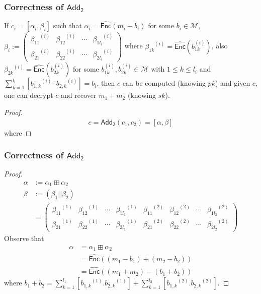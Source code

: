 \documentclass{beamer}
\begin{document}
\begin{frame}
\frametitle{Correctness of $\mathsf{Add_2}$}
\begin{theorem}
If $c_i=[\alpha_i,\beta_i]$ such that $\alpha_i=\widehat{\mathsf{Enc}}(m_i-b_i)$ for some $b_i \in \mathcal{M}$, $\beta_i:=  \left(\begin{array}{cccc} {\beta_{11}}^{(i)} & {\beta_{12}}^{(i)} & \cdots & {\beta_{1l_i}}^{(i)} \\ {\beta_{21}}^{(i)} & {\beta_{22}}^{(i)} & \cdots & {\beta_{2l_i}}^{(i)} \end{array} \right)$ where ${\beta_{1k}}^{(i)}=\widehat{\mathsf{Enc}}{(b_{1k}^{(i)})}$, also ${\beta_{2k}}^{(i)}=\widehat{\mathsf{Enc}}{(b_{2k}^{(i)})}$ for some $b_{1k}^{(i)},b_{2k}^{(i)} \in \mathcal{M}$ with $1 \leq k \leq  l_i$ and $\sum_{k=1}^{l_i}[{b_{1,k}}^{(i)} \cdot {b_{2,k}}^{(i)}]=b_i$, then $c$ can be computed (knowing $pk$) and given $c$, one can decrypt $c$ and recover $m_1+m_2$ (knowing $sk$).  
\end{theorem}
\begin{proof}
\begin{align*}
c=\mathsf{Add_2}(c_1,c_2)=[\alpha,\beta] \nonumber
\end{align*}
where
 
\end{proof}

\end{frame}

\begin{frame}
\frametitle{Correctness of $\mathsf{Add_2}$}
\begin{proof}
\begin{align*}
\alpha &:= \alpha_1 \boxplus \alpha_2 \nonumber \\
\beta  &:=(\beta_1 || \beta_2)\nonumber\\ &=\left(\begin{array}{cccccccc} {\beta_{11}}^{(1)} & {\beta_{12}}^{(1)} & \cdots & {\beta_{1l_1}}^{(1)} & {\beta_{11}}^{(2)} & {\beta_{12}}^{(2)} & \cdots & {\beta_{1l_2}}^{(2)} \\ {\beta_{21}}^{(1)} & {\beta_{22}}^{(1)} & \cdots & {\beta_{2l_1}}^{(1)}   & {\beta_{21}}^{(2)} & {\beta_{22}}^{(2)} & \cdots & {\beta_{2l_2}}^{(2)} \end{array} \right)\nonumber
\end{align*} 
Observe that
\begin{align*}
\alpha &= \alpha_1 \boxplus \alpha_2 \\
&={\widehat{\mathsf{Enc}}}((m_1-b_1)+(m_2-b_2)) \\
&= {\widehat{\mathsf{Enc}}}((m_1+m_2)-(b_1+b_2))
\end{align*}
where $b_1+b_2=\sum_{k=1}^{l_1}[{b_{1,k}}^{(1)}.{b_{2,k}}^{(1)}]+\sum_{k=1}^{l_2}[{b_{1,k}}^{(2)}.{b_{2,k}}^{(2)}]$. 
\end{proof}
\end{frame}
\end{document}
